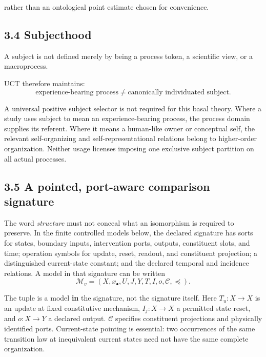 \documentclass[
  11pt,
  a4paper,
]{article}
\begin{document}
rather than an ontological point estimate chosen for convenience.

\hypertarget{subjecthood}{%
\subsection{3.4 Subjecthood}\label{subjecthood}}

A subject is not defined merely by being a process token, a scientific
view, or a macroprocess.

UCT therefore maintains:
\nopagebreak[4]
\[
\boxed{
\text{experience-bearing process}
\neq
\text{canonically individuated subject}.
}
\]

A universal positive subject selector is not required for this basal
theory. Where a study uses subject to mean an experience-bearing
process, the process domain supplies its referent. Where it means a
human-like owner or conceptual self, the relevant self-organizing and
self-representational relations belong to higher-order organization.
Neither usage licenses imposing one exclusive subject partition on all
actual processes.

\hypertarget{a-pointed-port-aware-comparison-signature}{%
\subsection{3.5 A pointed, port-aware comparison
signature}\label{a-pointed-port-aware-comparison-signature}}

The word \emph{structure} must not conceal what an isomorphism is
required to preserve. In the finite controlled models below, the
declared signature has sorts for states, boundary inputs, intervention
ports, outputs, constituent slots, and time; operation symbols for
update, reset, readout, and constituent projection; a distinguished
current-state constant; and the declared temporal and incidence
relations. A model in that signature can be written
\nopagebreak[4]
\[
\mathcal M_v=(X,x_\bullet,U,J,Y,T,I,o,\mathscr C,\preceq).
\]

The tuple is a model \textbf{in} the signature, not the signature
itself. Here \(T_u:X\to X\) is an update at fixed constitutive
mechanism, \(I_j:X\to X\) a permitted state reset, and \(o:X\to Y\) a
declared output. \(\mathscr C\) specifies constituent projections and
physically identified ports. Current-state pointing is essential: two
occurrences of the same transition law at inequivalent current states
need not have the same complete organization.
\end{document}
